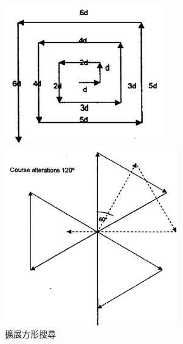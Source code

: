 \documentclass[12pt,a4paper]{ctexart}
\begin{document}
\begin{figure}[h]
    \centering
    \begin{minipage}[t]{0.3\textwidth}
        \centering
        \includegraphics[width=\textwidth]{image/ExpandingSquareSearch.png}
        \caption{擴展方形搜尋}
    \end{minipage}%
    \hfill
    \begin{minipage}[t]{0.3\textwidth}
        \centering
        \includegraphics[width=\textwidth]{image/SectorSearch.png}

\end{minipage}
\end{figure}
\end{document}
